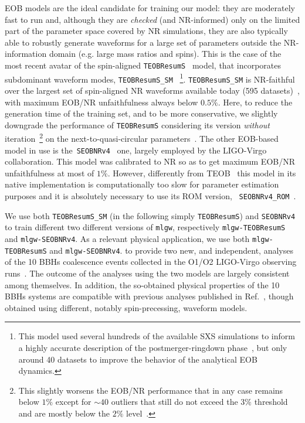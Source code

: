\documentclass[twocolumn,showpacs,preprintnumbers,nofootinbib,prd,
superscriptaddress,10pt]{revtex4-1}
\begin{document}
EOB models are the ideal candidate for training our model: they are moderately fast to run 
and, although they are {\it checked} (and NR-informed) only on the limited part of the 
parameter space covered by NR simulations,  they are also typically able to robustly 
generate waveforms for a large set of parameters outside the NR-information 
domain (e.g. large mass ratios and spins).
This is the case of the most recent avatar of the spin-aligned \texttt{TEOBResumS}~\cite{Nagar:2018zoe} 
model, that incorporates subdominant waveform modes, \texttt{TEOBResumS\_SM}~\cite{Nagar:2019wds,Nagar:2020pcj}
\footnote{This model used several hundreds of the available SXS simulations to inform a highly 
accurate description of the postmerger-ringdown phase~\cite{Damour:2014yha}, but 
only around 40 datasets to improve the behavior of the analytical EOB dynamics.}.
\texttt{TEOBResumS\_SM} is NR-faithful over the largest set of spin-aligned NR waveforms 
available today (595 datasets)~\cite{Nagar:2020pcj}, with maximum EOB/NR unfaithfulness 
always below $0.5\%$. Here, to reduce the generation time of the training set, and to be more 
conservative, we slightly downgrade the performance of \texttt{TEOBResumS} considering 
its version {\it without} iteration~\footnote{This slightly worsens the EOB/NR performance that in
any case remains below $1\%$ except for $\sim 40$ outliers that still do not exceed the $3\%$ 
threshold and are mostly below the $2\%$ level~\cite{Riemenschneider:2020}.} on 
the next-to-quasi-circular parameters~\cite{Nagar:2020pcj}.
The other EOB-based model in 
use is the~\texttt{SEOBNRv4}~\cite{Taracchini:2013rva,Bohe:2016gbl} one, largely employed 
by the LIGO-Virgo collaboration. This model was calibrated to NR so as to get  
maximum EOB/NR unfaithfulness at most of $1\%$. However, differently from 
TEOB~\cite{Nagar:2018zoe} this model in its native implementation is computationally 
too slow for parameter estimation purposes and it is absolutely necessary 
to use its ROM version, ~\texttt{SEOBNRv4\_ROM}~\cite{Bohe:2016gbl}.

We use both \texttt{TEOBResumS\_SM} (in the following simply \texttt{TEOBResumS}) 
and \texttt{SEOBNRv4} to train different two different versions of \texttt{mlgw}, respectively
\texttt{mlgw-TEOBResumS} and \texttt{mlgw-SEOBNRv4}.
As a relevant physical application, we use both 
\texttt{mlgw-TEOBResumS} and \texttt{mlgw-SEOBNRv4}.
to provide two new, and independent, analyses of the 10 BBHs 
coalescence events collected in the O1/O2 LIGO-Virgo observing 
runs~\cite{LIGOScientific:2018mvr}. The outcome of the analyses 
using the two models are largely consistent among themselves.
In addition,  the so-obtained physical properties of the 10 BBHs
systems are compatible with previous analyses published in
Ref.~\cite{LIGOScientific:2018mvr}, though obtained using
different, notably spin-precessing, waveform models.
\end{document}
